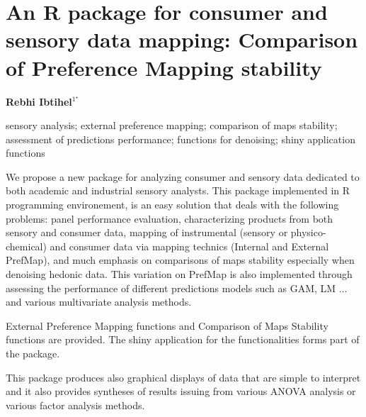 \documentclass[\main/boa.tex]{subfiles}
\begin{document}
\section{An R package for consumer and sensory data mapping: Comparison of Preference Mapping stability}

\begin{center}
  {\bf {} Rebhi Ibtihel$^{1^\star}$}
\end{center}

\vskip 0.3cm


\vskip 0.5cm

\begin{minipage}{0.915\textwidth}
\keywords sensory analysis; external preference mapping; comparison of maps stability; assessment of predictions performance; functions for denoising; shiny application
functions
\end{minipage}

\vskip 0.8cm

We propose a new package for analyzing consumer and sensory data dedicated to both academic and industrial sensory analysts. This package implemented in R programming environement, is an easy solution that deals with the following problems: panel performance
evaluation, characterizing products from both sensory and consumer data, mapping of instrumental (sensory or physico-chemical) and consumer data via mapping technics (Internal and External PrefMap), and much emphasis on comparisons of maps stability especially when denoising hedonic data. This variation on PrefMap is also implemented through assessing the performance of different predictions models such as GAM, LM ... and various multivariate analysis methods.

External Preference Mapping functions and Comparison of Maps Stability functions are provided. The shiny application for the functionalities forms part of the package.

This package produces also graphical displays of data that are simple to interpret and it also provides syntheses of results issuing from various ANOVA analysis or various factor analysis methods.
\end{document}
